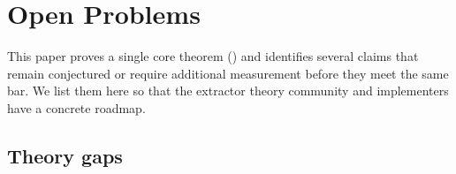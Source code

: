 
\section{Open Problems}
\label{sec:open-problems}

This paper proves a single core theorem () and
identifies several claims that remain conjectured or require
additional measurement before they meet the same bar. We list them
here so that the extractor theory community and implementers have
a concrete roadmap.

\subsection{Theory gaps}
\label{sec:open-problems:theory}

